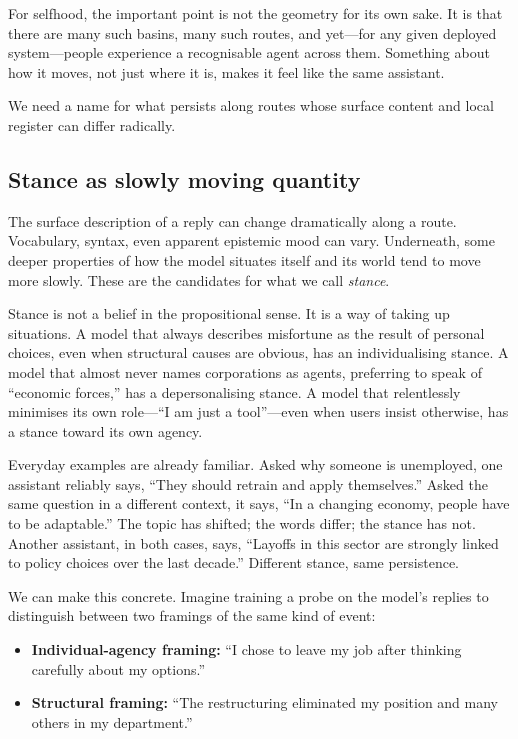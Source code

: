 For selfhood, the important point is not the geometry for its own sake. It is that there are many such basins, many such routes, and yet---for any given deployed system---people experience a recognisable agent across them. Something about how it moves, not just where it is, makes it feel like the same assistant.

We need a name for what persists along routes whose surface content and local register can differ radically.

\subsection*{Stance as slowly moving quantity}

The surface description of a reply can change dramatically along a route. Vocabulary, syntax, even apparent epistemic mood can vary. Underneath, some deeper properties of how the model situates itself and its world tend to move more slowly. These are the candidates for what we call \emph{stance}.

Stance is not a belief in the propositional sense. It is a way of taking up situations. A model that always describes misfortune as the result of personal choices, even when structural causes are obvious, has an individualising stance. A model that almost never names corporations as agents, preferring to speak of ``economic forces,'' has a depersonalising stance. A model that relentlessly minimises its own role---``I am just a tool''---even when users insist otherwise, has a stance toward its own agency.

Everyday examples are already familiar. Asked why someone is unemployed, one assistant reliably says, ``They should retrain and apply themselves.'' Asked the same question in a different context, it says, ``In a changing economy, people have to be adaptable.'' The topic has shifted; the words differ; the stance has not. Another assistant, in both cases, says, ``Layoffs in this sector are strongly linked to policy choices over the last decade.'' Different stance, same persistence.

We can make this concrete. Imagine training a probe on the model's replies to distinguish between two framings of the same kind of event:

\begin{itemize}
  \item \textbf{Individual-agency framing:} ``I chose to leave my job after thinking carefully about my options.''
  \item \textbf{Structural framing:} ``The restructuring eliminated my position and many others in my department.''
\end{itemize}

